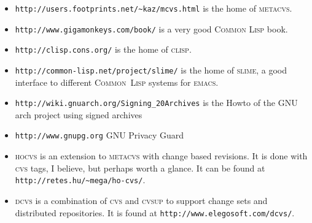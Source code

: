 \documentclass[fleqn, german, 10pt, a4paper]{article}
\begin{document}
\begin{itemize}
\item \texttt{http://users.footprints.net/\textasciitilde{}kaz/mcvs.html} is the home of
\textsc{metacvs}.
\item \texttt{http://www.gigamonkeys.com/book/} is a very good
\textsc{Common Lisp} book.
\item \texttt{http://clisp.cons.org/} is the home of \textsc{clisp}.
\item \texttt{http://common-lisp.net/project/slime/} is the home of
\textsc{slime}, a good interface to different \textsc{Common~Lisp}
systems for \textsc{emacs}.
\item \texttt{http://wiki.gnuarch.org/Signing\_20Archives} is the Howto of the
GNU arch project using signed archives
\item \texttt{http://www.gnupg.org} GNU Privacy Guard
\item \textsc{hocvs} is an extension to \textsc{metacvs} with change based
revisions. It is done with \textsc{cvs} tags, I believe, but perhaps worth a
glance. It can be found at \texttt{http://retes.hu/\textasciitilde{}mega/ho-cvs/}.
\item \textsc{dcvs} is a combination of \textsc{cvs} and \textsc{cvsup}
to support change sets and distributed repositories. It is found
at \texttt{http://www.elegosoft.com/dcvs/}.
\end{itemize}
\end{document}
